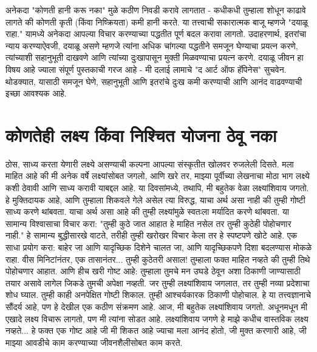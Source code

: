 अनेकदा "कोणती हानी करू नका" मुळे कठीण निवडी करावे लागतात - कधीकधी तुम्हाला शोधून काढावे लागते की कोणती कृती (किंवा निष्क्रियता) कमी हानी करते.
या तत्त्वाची सकारात्मक बाजू म्हणजे "दयाळू राहा." यामध्ये अनेकदा आपल्या विचार करण्याच्या पद्धतीत पूर्ण बदल करावा लागतो. उदाहरणार्थ, इतरांचा न्याय करण्याऐवजी, दयाळू असणे म्हणजे त्यांना अधिक चांगल्या पद्धतीने समजून घेण्याचा प्रयत्न करणे, त्यांच्याशी सहानुभूती दाखवणे आणि त्यांच्या दुःखापासून मुक्ती मिळवण्याचा प्रयत्न करणे.
दयाळू जीवन हा विषय आहे ज्याला संपूर्ण पुस्तकाची गरज आहे - मी दलाई लामाचे "द आर्ट ऑफ हॅपिनेस" सुचवेन. थोडक्यात, यासाठी समजून घेणे, सहानुभूती आणि इतरांचे दुःख कमी करण्याची आणि आनंद वाढवण्याची इच्छा आवश्यक आहे.

\chapter{कोणतेही लक्ष्य किंवा निश्चित योजना ठेवू नका}
ठोस, साध्य करता येणारी लक्ष्ये असण्याची कल्पना आपल्या संस्कृतीत खोलवर रुजलेली दिसते. मला माहित आहे की मी अनेक वर्षे लक्ष्यांसोबत जगलो, आणि खरे तर, माझ्या पूर्वीच्या लेखनाचा मोठा भाग लक्ष्ये कशी ठेवावी आणि साध्य करावी याबद्दल आहे.
या दिवसांमध्ये, तथापि, मी बहुतेक वेळा लक्ष्यांशिवाय जगतो. हे मुक्तिदायक आहे, आणि तुम्हाला शिकवले गेले असेल त्या विरुद्ध, याचा अर्थ असा नाही की तुम्ही गोष्टी साध्य करणे थांबवता.
याचा अर्थ असा आहे की तुम्ही लक्ष्यांमुळे स्वतःला मर्यादित करणे थांबवता.
या सामान्य विश्वासाचा विचार करा: "तुम्ही कुठे जात आहात हे माहित नसेल तर तुम्ही कुठेही पोहोचणार नाही." हे सामान्य बुद्धीसारखे वाटते, तरीही तुम्ही खरोखर विचार केला तर हे स्पष्टपणे खोटे आहे. एक साधा प्रयोग करा: बाहेर जा आणि यादृच्छिक दिशेने चालत जा, आणि यादृच्छिकपणे दिशा बदलण्यास मोकळे राहा. वीस मिनिटांनंतर, एक तासानंतर... तुम्ही कुठेतरी असाल! तुम्हाला फक्त माहित नव्हते की तुम्ही तिथे पोहोचणार आहात.
आणि हीच खरी गोष्ट आहे: तुम्हाला तुमचे मन उघडे ठेवून अशा ठिकाणी जाण्यासाठी तयार असावे लागेल जिकडे तुमची अपेक्षा नव्हती. जर तुम्ही लक्ष्यांशिवाय जगलात, तर तुम्ही नव्या प्रदेशाचा शोध घ्याल. तुम्ही काही अनपेक्षित गोष्टी शिकाल. तुम्ही आश्चर्यकारक ठिकाणी पोहोचाल. हे या तत्त्वज्ञानाचे सौंदर्य आहे, पण हे देखील एक कठीण संक्रमण आहे.
आज, मी बहुतेक लक्ष्यांशिवाय जगतो. अधूनमधून मी एखादे लक्ष्य विचारू लागतो, पण मी त्यांना सोडत आहे. लक्ष्यांशिवाय जगणे हे माझे कधीच वास्तविक लक्ष्य नव्हते... हे फक्त एक गोष्ट आहे जी मी शिकत आहे ज्याचा मला आनंद होतो, जी मुक्त करणारी आहे, जी माझ्या आवडीचे काम करण्याच्या जीवनशैलीसोबत काम करते.

